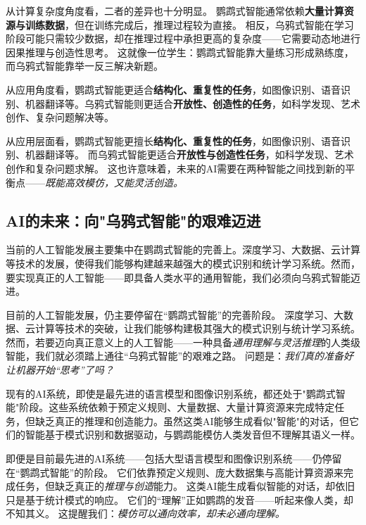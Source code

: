 从计算复杂度角度看，二者的差异也十分明显。
鹦鹉式智能通常依赖\textbf{大量计算资源与训练数据}，但在训练完成后，推理过程较为直接。
相反，乌鸦式智能在学习阶段可能只需较少数据，却在推理过程中承担更高的复杂度——它需要动态地进行因果推理与创造性思考。
这就像一位学生：鹦鹉式智能靠大量练习形成熟练度，而乌鸦式智能靠举一反三解决新题。


从应用角度看，鹦鹉式智能更适合\textbf{结构化、重复性的任务}，如图像识别、语音识别、机器翻译等。乌鸦式智能则更适合\textbf{开放性、创造性的任务}，如科学发现、艺术创作、复杂问题解决等。

从应用层面看，鹦鹉式智能更擅长\textbf{结构化、重复性的任务}，如图像识别、语音识别、机器翻译等。
而乌鸦式智能更适合\textbf{开放性与创造性任务}，如科学发现、艺术创作和复杂问题求解。
这也许意味着，未来的AI需要在两种智能之间找到新的平衡点——\emph{既能高效模仿，又能灵活创造。}
\subsection{AI的未来：向"乌鸦式智能"的艰难迈进}

当前的人工智能发展主要集中在鹦鹉式智能的完善上。深度学习、大数据、云计算等技术的发展，使得我们能够构建越来越强大的模式识别和统计学习系统。然而，要实现真正的人工智能——即具备人类水平的通用智能，我们必须向乌鸦式智能迈进。


目前的人工智能发展，仍主要停留在“鹦鹉式智能”的完善阶段。
深度学习、大数据、云计算等技术的突破，让我们能够构建极其强大的模式识别与统计学习系统。
然而，若要迈向真正意义上的人工智能——一种具备\emph{通用理解与灵活推理}的人类级智能，我们就必须踏上通往“乌鸦式智能”的艰难之路。
问题是：\emph{我们真的准备好让机器开始“思考”了吗？}

现有的AI系统，即使是最先进的语言模型和图像识别系统，都还处于"鹦鹉式智能"阶段。这些系统依赖于预定义规则、大量数据、大量计算资源来完成特定任务，但缺乏真正的推理和创造能力。虽然这类AI能够生成看似"智能"的对话，但它们的智能基于模式识别和数据驱动，与鹦鹉能模仿人类发音但不理解其语义一样。

即便是目前最先进的AI系统——包括大型语言模型和图像识别系统——仍停留在“鹦鹉式智能”的阶段。
它们依靠预定义规则、庞大数据集与高能计算资源来完成任务，但缺乏真正的\emph{推理与创造}能力。
这类AI能生成看似智能的对话，却依旧只是基于统计模式的响应。
它们的“理解”正如鹦鹉的发音——听起来像人类，却不知其义。
这提醒我们：\emph{模仿可以通向效率，却未必通向理解。}

